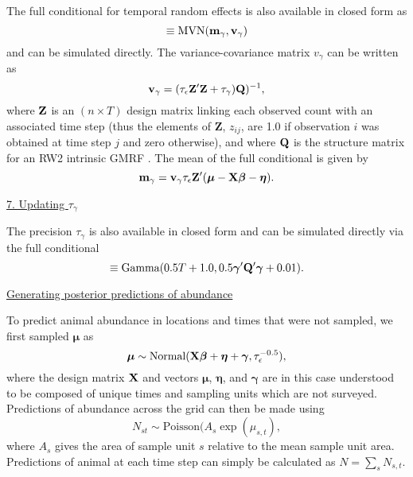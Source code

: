 \documentclass[12pt,fleqn]{article}
\begin{document}
\begin{flushleft}
The full conditional for temporal random effects is also available in closed form as
\begin{equation*}
  [\boldsymbol{\gamma} | \cdot] \equiv \textrm{MVN}({\bf m}_{\gamma},{\bf v}_{\gamma})
\end{equation*}
and can be simulated directly.  The variance-covariance matrix $v_{\gamma}$ can be written as
\begin{equation*}
  {\bf v}_{\gamma} = (\tau_\epsilon {\bf Z}^\prime {\bf Z} + \tau_\gamma){\bf Q})^{-1},
\end{equation*}
where ${\bf Z}$ is an $(n \times T)$ design matrix linking each observed count with an associated time step (thus the elements of {\bf Z}, $z_{ij}$, are 1.0 if observation $i$ was obtained at time step $j$ and zero otherwise), and where ${\bf Q}$ is the structure matrix for an RW2 intrinsic GMRF \citep[see][section 3.4]{RueHeld2005}.  The mean of the full conditional is given by
\begin{equation*}
  {\bf m}_{\gamma} = {\bf v}_\gamma \tau_\epsilon {\bf Z}^\prime (\boldsymbol{\mu}- {\bf X} \boldsymbol{\beta} - \boldsymbol{\eta}).
\end{equation*}

\underline{7. Updating $\tau_\gamma$}

The precision $\tau_\gamma$ is also available in closed form and can be simulated directly via the full conditional
\begin{equation*}
  [\tau_\gamma | \cdot] \equiv \textrm{Gamma}(0.5T + 1.0,0.5 \boldsymbol{\gamma}^\prime {\bf Q}^\prime \boldsymbol{\gamma} + 0.01).
\end{equation*}


\underline{Generating posterior predictions of abundance}

To predict animal abundance in locations and times that were not sampled, we first sampled $\boldsymbol{\mu}$ as
\begin{equation*}
  \boldsymbol{\mu} \sim \textrm{Normal}({\bf X} \boldsymbol{\beta} + \boldsymbol{\eta} + \boldsymbol{\gamma},\tau_\epsilon^{-0.5}),
\end{equation*}
where the design matrix ${\bf X}$ and vectors $\boldsymbol{\mu}$, $\boldsymbol{\eta}$, and $\boldsymbol{\gamma}$ are in this case understood to be composed of unique times and sampling units which are not surveyed.
Predictions of abundance across the grid can then be made using
\begin{equation*}
  N_{st} \sim \textrm{Poisson}(A_s \exp(\mu_{s,t}),
\end{equation*}
where $A_s$ gives the area of sample unit $s$ relative to the mean sample unit area.  Predictions of animal at
each time step can simply be calculated as $N = \sum_s N_{s,t}$.


\end{flushleft}
\end{document}
